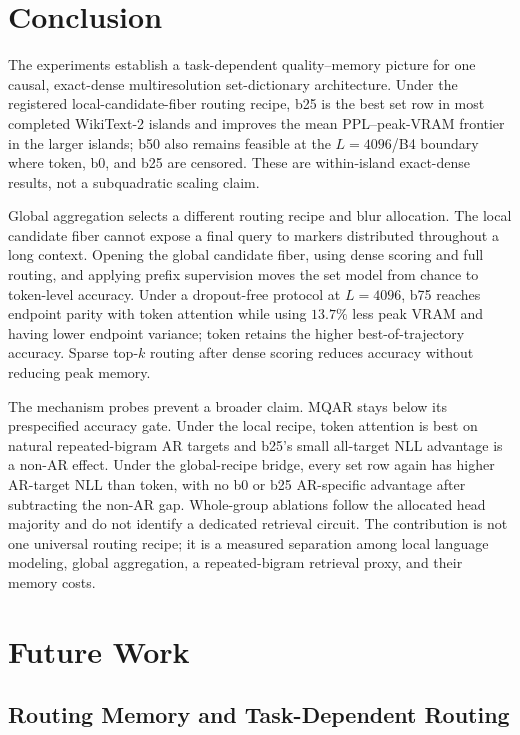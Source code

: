 \documentclass{article}
\theoremstyle{plain}
\theoremstyle{definition}
\theoremstyle{remark}
\begin{document}
\fi

\section{Conclusion}
The experiments establish a task-dependent quality--memory picture for one
causal, exact-dense multiresolution set-dictionary architecture.  Under the
registered local-candidate-fiber routing recipe, b25 is the best set row in
most completed WikiText-2 islands and improves the mean PPL--peak-VRAM
frontier in the larger islands; b50 also remains feasible at the
$L=4096$/B4 boundary where token, b0, and b25 are censored.  These are
within-island exact-dense results, not a subquadratic scaling claim.

Global aggregation selects a different routing recipe and blur allocation.
The local candidate fiber cannot expose a final query to markers distributed
throughout a long context.  Opening the global candidate fiber, using dense
scoring and full routing, and applying prefix supervision moves the set model
from chance to token-level accuracy.  Under a dropout-free protocol at
$L=4096$, b75 reaches endpoint parity with token attention while using
$13.7\%$ less peak VRAM and having lower endpoint variance; token retains the
higher best-of-trajectory accuracy.  Sparse top-$k$ routing after dense
scoring reduces accuracy without reducing peak memory.

The mechanism probes prevent a broader claim.  MQAR stays below its
prespecified accuracy gate.  Under the local recipe, token attention is best on
natural repeated-bigram AR targets and b25's small all-target NLL advantage is
a non-AR effect.  Under the global-recipe bridge, every set row again has
higher AR-target NLL than token, with no b0 or b25 AR-specific advantage after
subtracting the non-AR gap.  Whole-group ablations follow the allocated head
majority and do not identify a dedicated retrieval circuit.  The contribution
is not one universal routing recipe; it is a measured separation among local
language modeling, global aggregation, a repeated-bigram retrieval proxy, and
their memory costs.

\FloatBarrier

\section{Future Work}

\subsection{Routing Memory and Task-Dependent Routing}
\label{sec:future-routing-memory}
\end{document}
